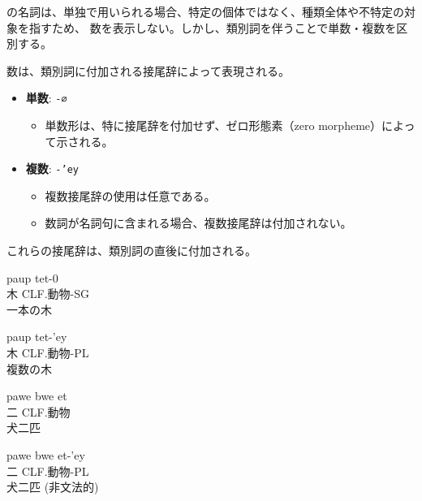 \langname の名詞は、単独で用いられる場合、特定の個体ではなく、種類全体や不特定の対象を指すため、
数を表示しない。しかし、類別詞を伴うことで単数・複数を区別する。

数は、類別詞に付加される接尾辞によって表現される。

\begin{itemize}
    \item \textbf{単数}: \texttt{-∅}
        \begin{itemize}
            \item 単数形は、特に接尾辞を付加せず、ゼロ形態素（zero morpheme）によって示される。
        \end{itemize}
    \item \textbf{複数}: \texttt{-'ey}
        \begin{itemize}
            \item 複数接尾辞の使用は任意である。
            \item 数詞が名詞句に含まれる場合、複数接尾辞は付加されない。
        \end{itemize}
\end{itemize}

これらの接尾辞は、類別詞の直後に付加される。

\begin{exe}
\ex
\gll paup tet-0 \\
木 CLF.動物-SG \\
\glt 一本の木

\ex
\gll paup tet-'ey \\
木 CLF.動物-PL \\
\glt 複数の木

\ex
\gll pawe bwe et \\
二 CLF.動物 \\
\glt 犬二匹

\ex
\gll *pawe bwe et-'ey \\
二 CLF.動物-PL \\
\glt 犬二匹 (非文法的)
\end{exe}